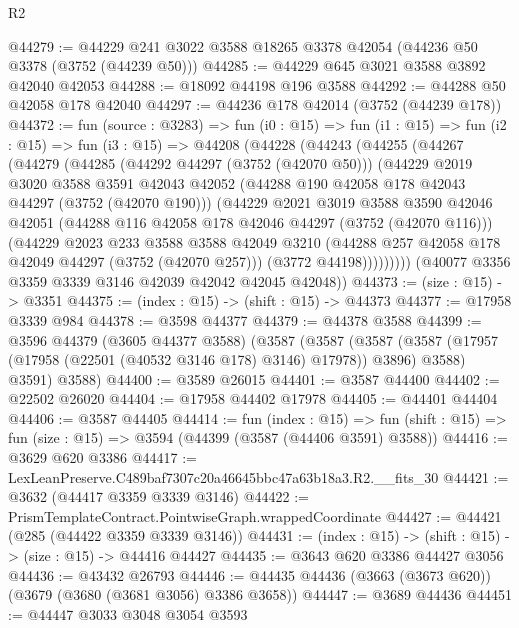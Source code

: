 \begin{lexlean}{R2}
\begin{coremodule}
@44279 := @44229 @241 @3022 @3588 @18265 @3378 @42054 (@44236 @50 @3378 (@3752 (@44239 @50)))
@44285 := @44229 @645 @3021 @3588 @3892 @42040 @42053
@44288 := @18092 @44198 @196 @3588
@44292 := @44288 @50 @42058 @178 @42040
@44297 := @44236 @178 @42014 (@3752 (@44239 @178))
@44372 := fun (source : @3283) =>
  fun (i0 : @15) =>
  fun (i1 : @15) =>
  fun (i2 : @15) =>
  fun (i3 : @15) =>
  @44208
    (@44228
      (@44243
        (@44255
          (@44267
            (@44279
              (@44285
                (@44292 @44297 (@3752 (@42070 @50)))
                (@44229
                  @2019
                  @3020
                  @3588
                  @3591
                  @42043
                  @42052
                  (@44288 @190 @42058 @178 @42043 @44297 (@3752 (@42070 @190)))
                  (@44229
                    @2021
                    @3019
                    @3588
                    @3590
                    @42046
                    @42051
                    (@44288 @116 @42058 @178 @42046 @44297 (@3752 (@42070 @116)))
                    (@44229
                      @2023
                      @233
                      @3588
                      @3588
                      @42049
                      @3210
                      (@44288 @257 @42058 @178 @42049 @44297 (@3752 (@42070 @257)))
                      (@3772 @44198)))))))))
      (@40077 @3356 @3359 @3339 @3146 @42039 @42042 @42045 @42048))
@44373 := (size : @15) -> @3351
@44375 := (index : @15) -> (shift : @15) -> @44373
@44377 := @17958 @3339 @984
@44378 := @3598 @44377
@44379 := @44378 @3588
@44399 := @3596
    @44379
    (@3605 @44377 @3588)
    (@3587
      (@3587
        (@3587 (@3587 (@17957 (@17958 (@22501 (@40532 @3146 @178) @3146) @17978)) @3896) @3588)
        @3591)
      @3588)
@44400 := @3589 @26015
@44401 := @3587 @44400
@44402 := @22502 @26020
@44404 := @17958 @44402 @17978
@44405 := @44401 @44404
@44406 := @3587 @44405
@44414 := fun (index : @15) =>
  fun (shift : @15) => fun (size : @15) => @3594 (@44399 (@3587 (@44406 @3591) @3588))
@44416 := @3629 @620 @3386
@44417 := LexLeanPreserve.C489baf7307c20a46645bbc47a63b18a3.R2.__fits_30
@44421 := @3632 (@44417 @3359 @3339 @3146)
@44422 := PrismTemplateContract.PointwiseGraph.wrappedCoordinate
@44427 := @44421 (@285 (@44422 @3359 @3339 @3146))
@44431 := (index : @15) -> (shift : @15) -> (size : @15) -> @44416 @44427
@44435 := @3643 @620 @3386 @44427 @3056
@44436 := @43432 @26793
@44446 := @44435 @44436 (@3663 (@3673 @620)) (@3679 (@3680 (@3681 @3056) @3386 @3658))
@44447 := @3689 @44436
@44451 := @44447 @3033 @3048 @3054 @3593

\end{coremodule}
\end{lexlean}
